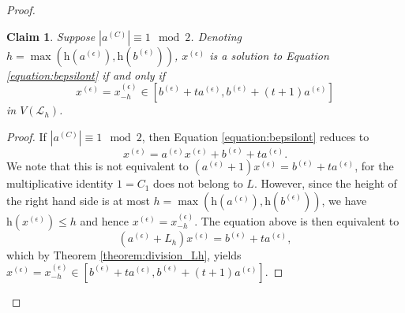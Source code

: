 \documentclass[10pt,a4paper]{amsart}
\newtheorem{claim}{Claim}
\newcommand{\Height}    {\mathrm{h}}
\begin{document}
\begin{proof}
\begin{claim}
Suppose $|a^{(C)}| \equiv 1 \mod 2$. Denoting $h = \max ( \Height( a^{(\epsilon)} ), \Height( b^{(\epsilon)} ) )$, $x^{(\epsilon)}$ is a solution to Equation \eqref{equation:bepsilont} if and only if
\[
    x^{(\epsilon)} = x^{(\epsilon)}_{ -h } \in [ b^{(\epsilon)} + t a^{(\epsilon)}, b^{(\epsilon)} + (t + 1) a^{(\epsilon)} ]
\]
in $V( \mathcal{L}_h )$.
\end{claim}


\begin{proof}
If $|a^{(C)}| \equiv 1 \mod 2$, then Equation \eqref{equation:bepsilont} reduces to
\[
    x^{(\epsilon)} = a^{(\epsilon)} x^{(\epsilon)} + b^{(\epsilon)} + t a^{(\epsilon)}.
\]
We note that this is not equivalent to $(a^{(\epsilon)} + 1)  x^{(\epsilon)} = b^{(\epsilon)} + t a^{(\epsilon)}$, for the multiplicative identity $1 = C_1$ does not belong to $L$. However, since the height of the right hand side is at most $h = \max ( \Height( a^{(\epsilon)} ), \Height( b^{(\epsilon)} ) )$, we have $\Height( x^{(\epsilon)} ) \le h$ and hence $x^{(\epsilon)} = x^{(\epsilon)}_{ -h }$.
The equation above is then equivalent to
\[
    ( a^{(\epsilon)} + L_h) x^{(\epsilon)} = b^{(\epsilon)} + t a^{(\epsilon)},
\]
which by Theorem \ref{theorem:division_Lh}, yields $x^{(\epsilon)} = x^{(\epsilon)}_{ -h } \in [ b^{(\epsilon)} + t a^{(\epsilon)}, b^{(\epsilon)} + (t + 1) a^{(\epsilon)} ]$.
\end{proof}

\end{proof}
\end{document}
